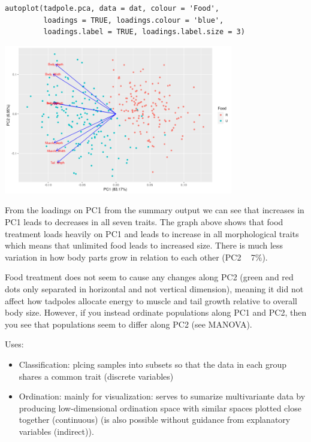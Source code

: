 \documentclass{article}
\begin{document}
\begin{lstlisting}
autoplot(tadpole.pca, data = dat, colour = 'Food',
         loadings = TRUE, loadings.colour = 'blue',
         loadings.label = TRUE, loadings.label.size = 3)
\end{lstlisting}

\begin{center}
    \includegraphics[width = 0.75\textwidth]{lab4/tadpole-pca.png}
\end{center}

From the loadings on PC1 from the summary output we can see that increases in PC1 leads to decreases in all seven traits. The graph above shows that food treatment loads heavily on PC1 and leads to increase in all morphological traits which means that unlimited food leads to increased size. There is much less variation in how body parts grow in relation to each other (PC2 ~ 7\%).\par 
Food treatment does not seem to cause any changes along PC2 (green and red dots only separated in horizontal and not vertical dimension), meaning it did not affect how tadpoles allocate energy to muscle and tail growth relative to overall body size. However, if you instead ordinate populations along PC1 and PC2, then you see that populations seem to differ along PC2 (see MANOVA). 

Uses:
\begin{itemize}
    \item Classification: plcing samples into subsets so that the data in each group shares a common trait (discrete variables)
    \item Ordination: mainly for visualization: serves to sumarize multivariante data by producing low-dimensional ordination space with similar spaces plotted close together (continuous) (is also possible without guidance from explanatory variables (indirect)).
\end{itemize}
\end{document}
